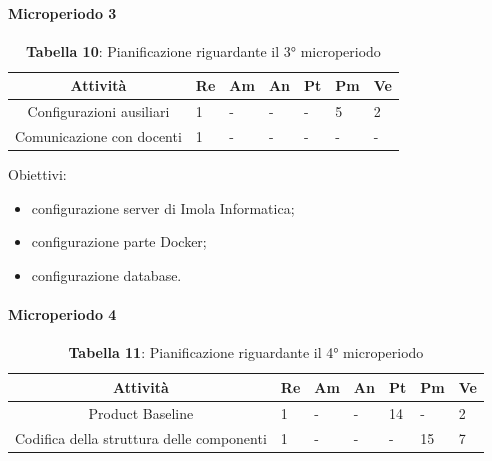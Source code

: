 \paragraph{Microperiodo 3}
\begin{table}[H]
	\centering
	\renewcommand{\arraystretch}{1.5}
	\begin{tabular}{|c|p{10mm}|p{10mm}|p{10mm}|p{10mm}|p{10mm}|p{10mm}|}
		\hline
		\rowcolor{lighter-grayer}
		\textbf{Attività}                         & \textbf{Re} & \textbf{Am} & \textbf{An} & \textbf{Pt} & \textbf{Pm} & \textbf{Ve} \\ \hline
		
		Configurazioni ausiliari & 1           &     -        &       -      &       -      & 5           & 2           \\ \hline
		Comunicazione con docenti  & 1           &     -        &      -       &     -        &      -       &        -     \\ \hline     
		
	\end{tabular}
	\caption*{\textbf{Tabella 10}: Pianificazione riguardante il 3° microperiodo\\}
\end{table}

Obiettivi:
\begin{itemize}
	\item configurazione server di Imola Informatica;
	\item configurazione parte Docker;
	\item configurazione database.
\end{itemize}

\paragraph{Microperiodo 4}
\begin{table}[H]
	\centering
	\renewcommand{\arraystretch}{1.5}
	\begin{tabular}{|c|p{10mm}|p{10mm}|p{10mm}|p{10mm}|p{10mm}|p{10mm}|}
		\hline
		\rowcolor{lighter-grayer}
		\textbf{Attività}                         & \textbf{Re} & \textbf{Am} & \textbf{An} & \textbf{Pt} & \textbf{Pm} & \textbf{Ve} \\ \hline
		
		Product Baseline                                        & 1           &     -        &    -         & 14          &    -         & 2           \\ \hline
		Codifica della struttura delle componenti & 1           &     -        &    -         &      -       & 15          & 7           \\ \hline
		
		
	\end{tabular}
	\caption*{\textbf{Tabella 11}: Pianificazione riguardante il 4° microperiodo\\}
\end{table}

